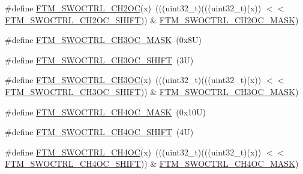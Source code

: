 \begin{DoxyCompactItemize}
\item 
\#define \mbox{\hyperlink{group___f_t_m___register___masks_ga9c318f90f38466a3f812f2e839c10d4f}{F\+T\+M\+\_\+\+S\+W\+O\+C\+T\+R\+L\+\_\+\+C\+H2\+OC}}(x)~(((uint32\+\_\+t)(((uint32\+\_\+t)(x)) $<$$<$ \mbox{\hyperlink{group___f_t_m___register___masks_gabafc3c919320572e1474319804e13958}{F\+T\+M\+\_\+\+S\+W\+O\+C\+T\+R\+L\+\_\+\+C\+H2\+O\+C\+\_\+\+S\+H\+I\+FT}})) \& \mbox{\hyperlink{group___f_t_m___register___masks_gafb399bfe91227e3c1ef409df4f3296b9}{F\+T\+M\+\_\+\+S\+W\+O\+C\+T\+R\+L\+\_\+\+C\+H2\+O\+C\+\_\+\+M\+A\+SK}})
\item 
\#define \mbox{\hyperlink{group___f_t_m___register___masks_ga67e490e5fc532feaba50ac976a8ba91c}{F\+T\+M\+\_\+\+S\+W\+O\+C\+T\+R\+L\+\_\+\+C\+H3\+O\+C\+\_\+\+M\+A\+SK}}~(0x8\+U)
\item 
\#define \mbox{\hyperlink{group___f_t_m___register___masks_ga1520a6f7f9d94248c38bb2b2a6fdd068}{F\+T\+M\+\_\+\+S\+W\+O\+C\+T\+R\+L\+\_\+\+C\+H3\+O\+C\+\_\+\+S\+H\+I\+FT}}~(3\+U)
\item 
\#define \mbox{\hyperlink{group___f_t_m___register___masks_gacdf8e9437f7582f05b61e1fb9c0c6f42}{F\+T\+M\+\_\+\+S\+W\+O\+C\+T\+R\+L\+\_\+\+C\+H3\+OC}}(x)~(((uint32\+\_\+t)(((uint32\+\_\+t)(x)) $<$$<$ \mbox{\hyperlink{group___f_t_m___register___masks_ga1520a6f7f9d94248c38bb2b2a6fdd068}{F\+T\+M\+\_\+\+S\+W\+O\+C\+T\+R\+L\+\_\+\+C\+H3\+O\+C\+\_\+\+S\+H\+I\+FT}})) \& \mbox{\hyperlink{group___f_t_m___register___masks_ga67e490e5fc532feaba50ac976a8ba91c}{F\+T\+M\+\_\+\+S\+W\+O\+C\+T\+R\+L\+\_\+\+C\+H3\+O\+C\+\_\+\+M\+A\+SK}})
\item 
\#define \mbox{\hyperlink{group___f_t_m___register___masks_ga8e7d553c823d031e23a2ca14cef77ed4}{F\+T\+M\+\_\+\+S\+W\+O\+C\+T\+R\+L\+\_\+\+C\+H4\+O\+C\+\_\+\+M\+A\+SK}}~(0x10\+U)
\item 
\#define \mbox{\hyperlink{group___f_t_m___register___masks_gaf60fd436bae3cc28d58bdef99ce082c9}{F\+T\+M\+\_\+\+S\+W\+O\+C\+T\+R\+L\+\_\+\+C\+H4\+O\+C\+\_\+\+S\+H\+I\+FT}}~(4\+U)
\item 
\#define \mbox{\hyperlink{group___f_t_m___register___masks_ga904e54d8b014c3174108ede250b6a989}{F\+T\+M\+\_\+\+S\+W\+O\+C\+T\+R\+L\+\_\+\+C\+H4\+OC}}(x)~(((uint32\+\_\+t)(((uint32\+\_\+t)(x)) $<$$<$ \mbox{\hyperlink{group___f_t_m___register___masks_gaf60fd436bae3cc28d58bdef99ce082c9}{F\+T\+M\+\_\+\+S\+W\+O\+C\+T\+R\+L\+\_\+\+C\+H4\+O\+C\+\_\+\+S\+H\+I\+FT}})) \& \mbox{\hyperlink{group___f_t_m___register___masks_ga8e7d553c823d031e23a2ca14cef77ed4}{F\+T\+M\+\_\+\+S\+W\+O\+C\+T\+R\+L\+\_\+\+C\+H4\+O\+C\+\_\+\+M\+A\+SK}})
$$
\end{DoxyCompactItemize}
